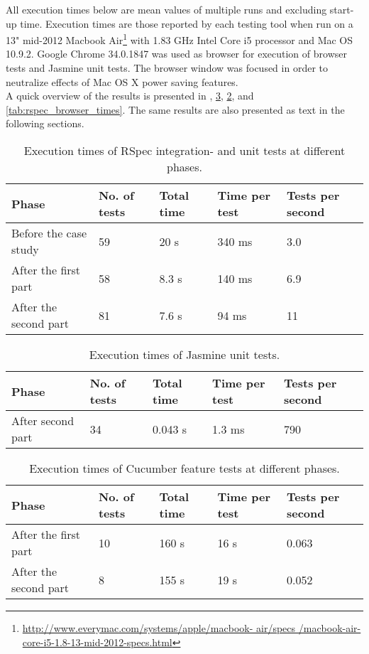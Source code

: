 \label{sec:results_time}

All execution times below are mean values of multiple runs and excluding
start-up time. Execution times are those reported by each testing tool
when run on a 13" mid-2012 Macbook
Air\footnote{\url{http://www.everymac.com/systems/apple/macbook-
air/specs /macbook-air-core-i5-1.8-13-mid-2012-specs.html}} with 1.83
GHz Intel Core i5 processor and Mac OS 10.9.2. Google Chrome 34.0.1847
was used as browser for execution of browser tests and Jasmine unit
tests. The browser window was focused in order to neutralize effects of
Mac OS X power saving features.\\

A quick overview of the results is presented in ,
\ref{tab:cucumber_times}, \ref{tab:jasmine_times}, and
\ref{tab:rspec_browser_times}. The same results are also presented as
text in the following sections.\\

\begin{table}[t]
    \centering
    \begin{tabular}{l l l l l}
        Phase & No. of tests & Total time & Time per test & Tests per second\\
        \hline
        Before the case study & 59 & 20 s & 340 ms & 3.0 \\
        After the first part  & 58 & 8.3 s  & 140 ms & 6.9 \\
        After the second part & 81 & 7.6 s  & 94 ms & 11\\
    \end{tabular}
    \caption{ Execution times of RSpec integration- and unit tests at different phases. }
    \label{tab:unit_times}
\end{table}

\begin{table}[t]
    \centering
    \begin{tabular}{l l l l l}
        Phase & No. of tests & Total time & Time per test & Tests per second \\
        \hline
        After second part & 34 &  0.043 s & 1.3 ms & 790\\
    \end{tabular}
    \caption{ Execution times of Jasmine unit tests. }
    \label{tab:jasmine_times}
\end{table}

\begin{table}[t]
    \centering
    \begin{tabular}{l l l l l}
        Phase & No. of tests & Total time & Time per test & Tests per second \\
        \hline
        After the first part  & 10 & 160 s & 16 s & 0.063\\
        After the second part & 8 &  155 s & 19 s & 0.052\\
    \end{tabular}
    \caption{ Execution times of Cucumber feature tests at different phases. }
    \label{tab:cucumber_times}
\end{table}

